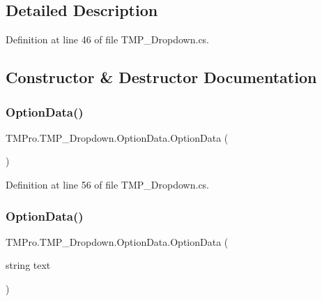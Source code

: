\subsection{Detailed Description}


Definition at line 46 of file T\+M\+P\+\_\+\+Dropdown.\+cs.



\subsection{Constructor \& Destructor Documentation}
\mbox{\label{class_t_m_pro_1_1_t_m_p___dropdown_1_1_option_data_a653b593028b29eb36d0c54003ed5eaf9}} 
\subsubsection{\texorpdfstring{OptionData()}{OptionData()}\hspace{0.1cm}{\footnotesize\ttfamily [1/4]}}
{\footnotesize\ttfamily T\+M\+Pro.\+T\+M\+P\+\_\+\+Dropdown.\+Option\+Data.\+Option\+Data (\begin{DoxyParamCaption}{ }\end{DoxyParamCaption})}



Definition at line 56 of file T\+M\+P\+\_\+\+Dropdown.\+cs.

\mbox{\label{class_t_m_pro_1_1_t_m_p___dropdown_1_1_option_data_a0e37d6281604ed9557b1177aa954602f}} 
\subsubsection{\texorpdfstring{OptionData()}{OptionData()}\hspace{0.1cm}{\footnotesize\ttfamily [2/4]}}
{\footnotesize\ttfamily T\+M\+Pro.\+T\+M\+P\+\_\+\+Dropdown.\+Option\+Data.\+Option\+Data (\begin{DoxyParamCaption}\item[{string}]{text }\end{DoxyParamCaption})}



